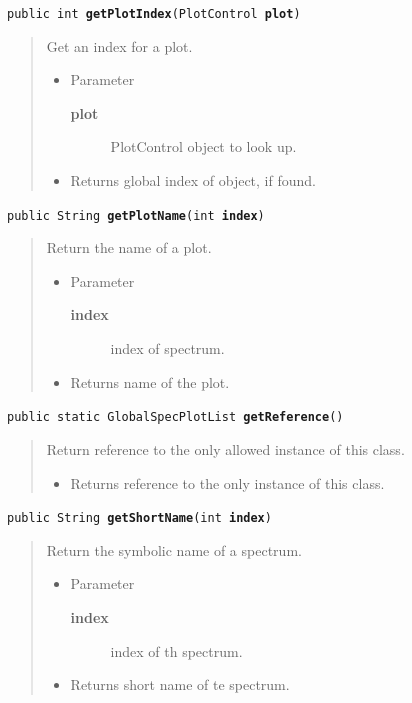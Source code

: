 \documentclass[twoside,11pt]{article}
\renewcommand{\_}{\texttt{\symbol{95}}}
\newcommand{\method}[1]{\texttt{#1}}
\newenvironment{desc}{\begin{quote}}{\end{quote}}
\begin{document}
\method{public int \textbf{getPlotIndex}(\texttt{PlotControl} \textbf{plot})\label{l285}\label{l286}}
\begin{desc}Get an index for a plot.
\begin{itemize}
\item{Parameter
  \begin{description}
   \item[\textbf{plot}]{PlotControl object to look up.}
  \end{description}}
\end{itemize}
\begin{itemize}
\item{Returns global index of object, if found. }
\end{itemize}
\end{desc}

\method{public String \textbf{getPlotName}(\texttt{int} \textbf{index})\label{l287}\label{l288}}
\begin{desc}Return the name of a plot.
\begin{itemize}
\item{Parameter
  \begin{description}
   \item[\textbf{index}]{index of spectrum.}
  \end{description}}
\end{itemize}
\begin{itemize}
\item{Returns name of the plot. }
\end{itemize}
\end{desc}

\method{public static GlobalSpecPlotList \textbf{getReference}()\label{l289}\label{l290}}
\begin{desc}Return reference to the only allowed instance of this class.
\begin{itemize}
\item{Returns reference to the only instance of this class. }
\end{itemize}
\end{desc}

\method{public String \textbf{getShortName}(\texttt{int} \textbf{index})\label{l291}\label{l292}}
\begin{desc}Return the symbolic name of a spectrum.
\begin{itemize}
\item{Parameter
  \begin{description}
   \item[\textbf{index}]{index of th spectrum.}
  \end{description}}
\end{itemize}
\begin{itemize}
\item{Returns short name of te spectrum. }
\end{itemize}
\end{desc}
\end{document}
